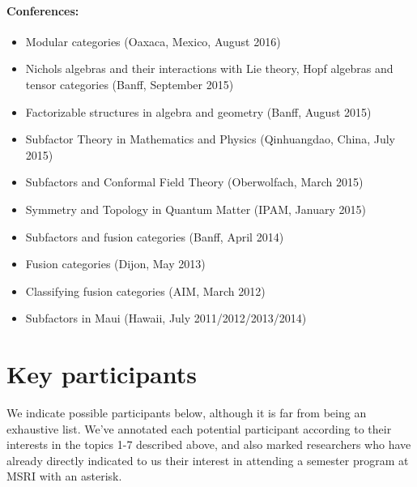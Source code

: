 \documentclass[12pt]{article}
\begin{document}
\paragraph{Conferences:}
\begin{itemize}
  \setlength{\itemsep}{1pt}
  \setlength{\parskip}{0pt}
  \setlength{\parsep}{0pt}
\item Modular categories (Oaxaca, Mexico, August 2016)
\item Nichols algebras and their interactions with Lie theory, Hopf algebras and tensor categories (Banff, September 2015)
\item Factorizable structures in algebra and geometry (Banff, August 2015)
\item Subfactor Theory in Mathematics and Physics (Qinhuangdao, China, July 2015)
\item Subfactors and Conformal Field Theory (Oberwolfach, March 2015)
\item Symmetry and Topology in Quantum Matter (IPAM, January 2015)
\item Subfactors and fusion categories (Banff, April 2014)
\item Fusion categories (Dijon, May 2013)
\item Classifying fusion categories (AIM, March 2012)
\item Subfactors in Maui (Hawaii, July 2011/2012/2013/2014)
\end{itemize}

\section{Key participants}
We indicate possible participants below, although it is far from being an exhaustive list. We've annotated each potential participant according to their interests in the topics 1-7 described above, and also marked researchers who have already directly indicated to us their interest in attending a semester program at MSRI with an asterisk.
\end{document}
